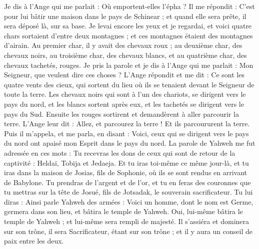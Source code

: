 \begin{multicols}{2}
Je dis à l'Ange qui me parlait : Où emportent-elles l'épha ?
Il me répondit : C'est pour lui bâtir une maison dans le pays de Schinear ; et quand elle sera prête, il sera déposé là, sur sa base.
\VerseOne{}Je levai encore les yeux et je regardai, et voici quatre chars sortaient d'entre deux montagnes ; et ces montagnes étaient des montagnes d'airain.
Au premier char, il y avait des chevaux roux ; au deuxième char, des chevaux noirs,
au troisième char, des chevaux blancs, et au quatrième char, des chevaux tachetés, rouges.
Je pris la parole et je dis à l'Ange qui me parlait : Mon Seigneur, que veulent dire ces choses ?
L'Ange répondit et me dit : Ce sont les quatre vents des cieux, qui sortent du lieu où ils se tenaient devant le Seigneur de toute la terre.
Les chevaux noirs qui sont à l’un des chariots, se dirigent vers le pays du nord, et les blancs sortent après eux, et les tachetés se dirigent vers le pays du Sud.
Ensuite les rouges sortirent et demandèrent à aller parcourir la terre. L'Ange leur dit : Allez, et parcourez la terre ! Et ils parcoururent la terre.
Puis il m'appela, et me parla, en disant : Voici, ceux qui se dirigent vers le pays du nord ont apaisé mon Esprit dans le pays du nord.
La parole de Yahweh me fut adressée en ces mots :
Tu recevras les dons de ceux qui sont de retour de la captivité : Heldaï, Tobija et Jedaeja. Et tu iras toi-même ce même jour-là, et tu iras dans la maison de Josias, fils de Sophonie, où ils se sont rendus en arrivant de Babylone.
Tu prendras de l'argent et de l'or, et tu en feras des couronnes que tu mettras sur la tête de Josué, fils de Jotsadak, le souverain sacrificateur.
Tu lui diras : Ainsi parle Yahweh des armées : Voici un homme, dont le nom est Germe, germera dans son lieu, et bâtira le temple de Yahweh.
Oui, lui-même bâtira le temple de Yahweh ; et lui-même sera rempli de majesté. Il s'assiéra et dominera sur son trône, il sera Sacrificateur, étant sur son trône ; et il y aura un conseil de paix entre les deux.

\end{multicols}
